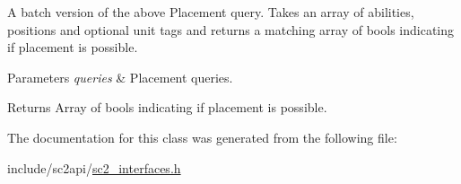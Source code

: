 A batch version of the above Placement query. Takes an array of abilities, positions and optional unit tags and returns a matching array of bools indicating if placement is possible. 
\begin{DoxyParams}{Parameters}
{\em queries} & Placement queries. \\
\hline
\end{DoxyParams}
\begin{DoxyReturn}{Returns}
Array of bools indicating if placement is possible. 
\end{DoxyReturn}


The documentation for this class was generated from the following file\+:\begin{DoxyCompactItemize}
\item 
include/sc2api/\hyperlink{sc2__interfaces_8h}{sc2\+\_\+interfaces.\+h}\end{DoxyCompactItemize}
